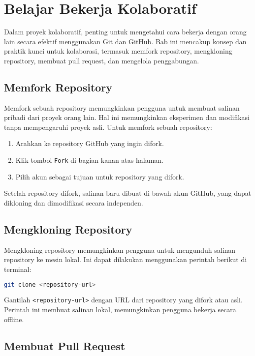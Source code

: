 \chapter{Belajar Bekerja Kolaboratif}

Dalam proyek kolaboratif, penting untuk mengetahui cara bekerja dengan orang lain secara efektif menggunakan Git dan GitHub. Bab ini mencakup konsep dan praktik kunci untuk kolaborasi, termasuk memfork repository, mengkloning repository, membuat pull request, dan mengelola penggabungan.

\section{Memfork Repository}

Memfork sebuah repository memungkinkan pengguna untuk membuat salinan pribadi dari proyek orang lain. Hal ini memungkinkan eksperimen dan modifikasi tanpa mempengaruhi proyek asli. Untuk memfork sebuah repository:

\begin{enumerate}
	\item Arahkan ke repository GitHub yang ingin difork.
	\item Klik tombol \texttt{Fork} di bagian kanan atas halaman.
	\item Pilih akun sebagai tujuan untuk repository yang difork.
\end{enumerate}

Setelah repository difork, salinan baru dibuat di bawah akun GitHub, yang dapat dikloning dan dimodifikasi secara independen.

\section{Mengkloning Repository}

Mengkloning repository memungkinkan pengguna untuk mengunduh salinan repository ke mesin lokal. Ini dapat dilakukan menggunakan perintah berikut di terminal:

\begin{lstlisting}[language=bash]
	git clone <repository-url>
\end{lstlisting}

Gantilah \texttt{<repository-url>} dengan URL dari repository yang difork atau asli. Perintah ini membuat salinan lokal, memungkinkan pengguna bekerja secara offline.

\section{Membuat Pull Request}

